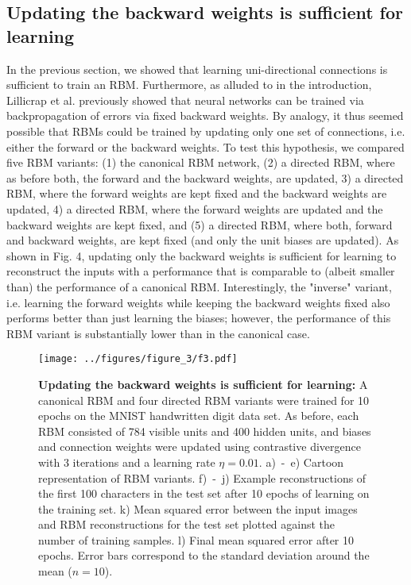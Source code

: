 \documentclass[11pt]{article}
\begin{document}
\subsection{Updating the backward weights is sufficient for learning}

In the previous section, we showed that learning uni-directional
connections is sufficient to train an RBM. Furthermore, as alluded to
in the introduction, Lillicrap et al. previously showed that neural
networks can be trained via backpropagation of errors via fixed
backward weights. By analogy, it thus seemed possible that RBMs could
be trained by updating only one set of connections, i.e. either the
forward or the backward weights. To test this hypothesis, we compared
five RBM variants: (1) the canonical RBM network, (2) a directed RBM,
where as before both, the forward and the backward weights, are
updated, 3) a directed RBM, where the forward weights are kept fixed
and the backward weights are updated, 4) a directed RBM, where the
forward weights are updated and the backward weights are kept fixed,
and (5) a directed RBM, where both, forward and backward weights, are
kept fixed (and only the unit biases are updated). As shown in Fig. 4,
updating only the backward weights is sufficient for learning to
reconstruct the inputs with a performance that is comparable to
(albeit smaller than) the performance of a canonical
RBM. Interestingly, the "inverse" variant, i.e. learning the forward
weights while keeping the backward weights fixed also performs better
than just learning the biases; however, the performance of this RBM
variant is substantially lower than in the canonical case.

\begin{figure}[H]
  \label{fig:backward_rbm}
  \centering
  \texttt{[image: ../figures/figure\_3/f3.pdf]}
  \caption{\footnotesize
    \textbf{Updating the backward weights is sufficient for learning:}
    A canonical RBM and four directed RBM variants were trained for 10 epochs on the MNIST handwritten digit data set.
    As before, each RBM consisted of 784 visible units and 400 hidden
    units, and biases and connection weights were updated using contrastive
    divergence with 3 iterations and a learning rate $\eta=0.01$.
    a)~-~e) Cartoon representation of RBM variants.
    f)~-~j) Example reconstructions of the first 100 characters in the test set after 10 epochs of learning on the training set.
    k) Mean squared error between the input images and RBM reconstructions for the test set plotted against the number of training samples.
    l) Final mean squared error after 10 epochs. Error bars correspond to the standard deviation around the mean ($n = 10$).
  }
\end{figure}
\end{document}
